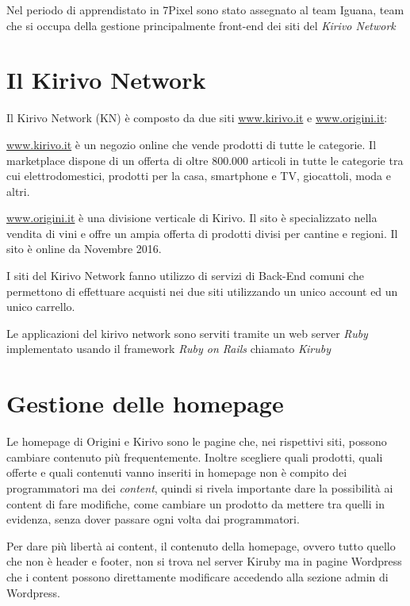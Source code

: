 


Nel periodo di apprendistato in 7Pixel sono stato assegnato al team Iguana, team che si occupa
della gestione principalmente front-end dei siti del \emph{Kirivo Network}

\section{Il Kirivo Network}
Il Kirivo Network (KN) è composto da due siti  \url{www.kirivo.it} 
e \url{www.origini.it}:

\url{www.kirivo.it} è un negozio online che vende prodotti di tutte le categorie.
Il marketplace dispone di un offerta di oltre 800.000 articoli in tutte le categorie tra cui
elettrodomestici, prodotti per la casa, smartphone e TV, giocattoli, moda e altri.

\url{www.origini.it} è una divisione verticale di Kirivo. Il sito è specializzato nella vendita
di vini e offre un ampia offerta di prodotti divisi per cantine e regioni. Il sito
è online da Novembre 2016.

I siti del Kirivo Network fanno utilizzo di servizi di Back-End comuni che permettono 
di effettuare acquisti nei due siti utilizzando un unico account ed un unico carrello.

Le applicazioni del kirivo network sono serviti tramite un web server \emph{Ruby} implementato
usando il framework \emph{Ruby on Rails} chiamato \emph{Kiruby}

\section{Gestione delle homepage}

Le homepage di Origini e Kirivo sono le pagine che, nei rispettivi siti, possono cambiare contenuto più 
frequentemente. Inoltre scegliere quali prodotti, quali offerte e quali contenuti 
vanno inseriti in homepage non è compito dei programmatori ma dei \emph{content},
quindi si rivela importante dare la possibilità ai content di fare modifiche, come cambiare un prodotto da
mettere tra quelli in evidenza, senza dover passare ogni volta dai programmatori.

Per dare più libertà ai content, il contenuto della homepage, ovvero tutto quello che non è
header e footer, non si trova nel server Kiruby ma in pagine Wordpress che i content possono direttamente 
modificare accedendo alla sezione admin di Wordpress.

